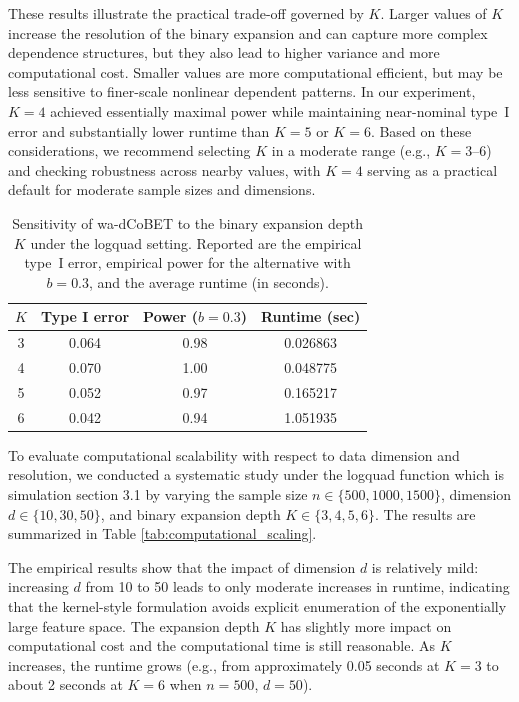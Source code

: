 \documentclass[12pt,reqno,oneside]{amsbook}
\theoremstyle{definition}
\theoremstyle{remark}
\begin{document}
 These results illustrate the practical trade-off governed by $K$. Larger values of $K$ increase the resolution of the binary expansion and can capture more complex dependence structures, but they also lead to higher variance and more computational cost. Smaller values are more computational efficient, but may be less sensitive to finer-scale nonlinear dependent patterns. In our experiment, $K=4$ achieved essentially maximal power while maintaining near-nominal type~I error and substantially lower runtime than $K=5$ or $K=6$. Based on these considerations, we recommend selecting $K$ in a moderate range (e.g., $K=3$--$6$) and checking robustness across nearby values, with $K=4$ serving as a practical default for moderate sample sizes and dimensions.

\begin{table}[htbp!]
\centering
\begin{tabular}{c c c c}
\hline
$K$ & Type I error & Power ($b=0.3$) & Runtime (sec) \\
\hline
3 & 0.064 & 0.98 & 0.026863 \\
4 & 0.070 & 1.00 & 0.048775 \\
5 & 0.052 & 0.97 & 0.165217 \\
6 & 0.042 & 0.94 & 1.051935 \\
\hline
\end{tabular}
\caption{Sensitivity of wa-dCoBET to the binary expansion depth $K$ under the logquad setting. Reported are the empirical type~I error, empirical power for the alternative with $b=0.3$, and the average runtime (in seconds).}
\label{tab:K_sensitivity_wa_dcobet}
\end{table}

To evaluate computational scalability with respect to data dimension and resolution, we conducted a systematic study under the logquad function which is simulation section 3.1 by varying the sample size $n \in \{500,1000,1500\}$, dimension $d \in \{10,30,50\}$, and binary expansion depth $K \in \{3,4,5,6\}$. The results are summarized in Table \ref{tab:computational_scaling}.

The empirical results show that the impact of dimension $d$ is relatively mild: increasing $d$ from 10 to 50 leads to only moderate increases in runtime, indicating that the kernel-style formulation avoids explicit enumeration of the exponentially large feature space. The expansion depth $K$ has slightly more impact on computational cost and the computational time is still reasonable. As $K$ increases, the runtime grows (e.g., from approximately 0.05 seconds at $K=3$ to about 2 seconds at $K=6$ when $n=500$, $d=50$).
\end{document}
